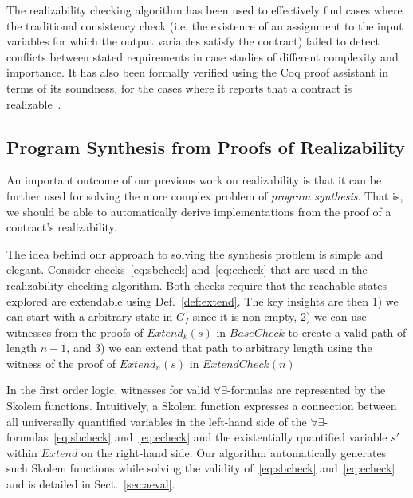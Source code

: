 The realizability checking algorithm has been used to effectively find cases
where the traditional consistency check (i.e. the existence of an assignment
to the input variables for which the output variables satisfy the contract)
failed to detect conflicts between stated requirements in case studies of
different complexity and importance. It has also been formally verified using the Coq proof assistant in terms of its
soundness, for the cases where it reports that a contract is
realizable~\cite{katis2015machine}.

\subsection{Program Synthesis from Proofs of Realizability}

An important outcome of our previous work on realizability is that it
can be further used for solving the more complex problem of
\emph{program synthesis}. That is, we should be able to automatically
derive implementations from the proof of a contract's realizability.

The idea behind our approach to solving the synthesis problem is
simple and elegant. Consider checks~\eqref{eq:sbcheck}
and~\eqref{eq:echeck} that are used in the realizability checking
algorithm. Both checks require that the reachable states explored are
extendable using Def.~\ref{def:extend}. The key insights are then 1)
we can start with a arbitrary state in $G_I$ since it is non-empty, 2)
we can use witnesses from the proofs of $\mathit{Extend}_k(s)$ in
$\mathit{BaseCheck}$ to create a valid path of length $n-1$, and 3) we
can extend that path to arbitrary length using the witness of the
proof of $\mathit{Extend}_n(s)$ in $\mathit{ExtendCheck}(n)$

In the first order logic, witnesses for valid
$\forall\exists$-formulas are represented by the Skolem functions.
Intuitively, a Skolem function expresses a connection between all
universally quantified variables in the left-hand side of the
$\forall\exists$-formulas~\eqref{eq:sbcheck} and~\eqref{eq:echeck} and
the existentially quantified variable $s'$ within $\mathit{Extend}$ on
the right-hand side. Our algorithm automatically generates such Skolem
functions while solving the validity of~\eqref{eq:sbcheck}
and~\eqref{eq:echeck} and is detailed in Sect.~\ref{sec:aeval}.

